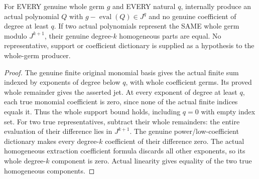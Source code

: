 \begin{lemma}
\label{hir:relative-normal-graph-central-actual-bounded-polynomial-jets}
\leanok
For EVERY genuine whole germ $g$ and EVERY natural $q$, internally produce an actual polynomial $Q$ with $g-\operatorname{eval}(Q)\in J^q$ and no genuine coefficient of degree at least $q$. If two actual polynomials represent the SAME whole germ modulo $J^{k+1}$, their genuine degree-$k$ homogeneous parts are equal. No representative, support or coefficient dictionary is supplied as a hypothesis to the whole-germ producer.
\end{lemma}
\begin{proof}
The genuine finite original monomial basis gives the actual finite sum indexed by exponents of degree below $q$, with whole coefficient germs. Its proved whole remainder gives the asserted jet. At every exponent of degree at least $q$, each true monomial coefficient is zero, since none of the actual finite indices equals it. Thus the whole support bound holds, including $q=0$ with empty index set. For two true representatives, subtract their whole remainders: the entire evaluation of their difference lies in $J^{k+1}$. The genuine power/low-coefficient dictionary makes every degree-$k$ coefficient of their difference zero. The actual homogeneous extraction coefficient formula discards all other exponents, so its whole degree-$k$ component is zero. Actual linearity gives equality of the two true homogeneous components.
\end{proof}

